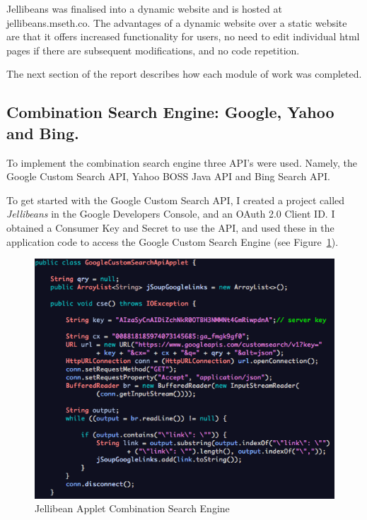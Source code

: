 \documentclass[a4paper, 11pt]{article}
\begin{document}
\vspace{5mm}
Jellibeans was finalised into a dynamic website and is hosted at jellibeans.mseth.co. The advantages of a dynamic website over a static website are that it offers increased functionality for users, no need to edit individual html pages if there are subsequent modifications, and no code repetition. 

\vspace{5mm}
The next section of the report describes how each module of work was completed.

\subsection{Combination Search Engine: Google, Yahoo and Bing.} 
To implement the combination search engine three API's were used. Namely, the Google Custom Search API, Yahoo BOSS Java API and Bing Search API. 

\vspace{5mm}
To get started with the Google Custom Search API, I created a project called \textit{Jellibeans} in the Google Developers Console, and an OAuth 2.0 Client ID. I obtained a Consumer Key and Secret to use the API, and used these in the application code to access the Google Custom Search Engine (see Figure~\ref{JBeanAppletGoogleCustomSearch1}). 

\begin{figure}[H]
\begin{center}
\includegraphics[scale=0.7]{JBeanAppletGoogleCustomSearch}
\end{center}

\caption{Jellibean Applet Combination Search Engine}
\label{JBeanAppletGoogleCustomSearch1}
\end{figure}
\end{document}
